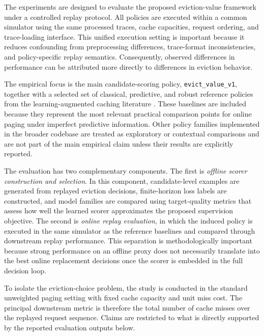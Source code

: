 \documentclass[preprint,12pt]{elsarticle}
\begin{document}
The experiments are designed to evaluate the proposed eviction-value framework under a controlled replay protocol. All policies are executed within a common simulator using the same processed traces, cache capacities, request ordering, and trace-loading interface. This unified execution setting is important because it reduces confounding from preprocessing differences, trace-format inconsistencies, and policy-specific replay semantics. Consequently, observed differences in performance can be attributed more directly to differences in eviction behavior.

The empirical focus is the main candidate-scoring policy, \texttt{evict\_value\_v1}, together with a selected set of classical, predictive, and robust reference policies from the learning-augmented caching literature \cite{lykouris2021competitive_caching,antoniadis2020online_metric_untrusted,wei2020better_simpler_lac,chledowski2021robust_lac_experimental}. These baselines are included because they represent the most relevant practical comparison points for online paging under imperfect predictive information. Other policy families implemented in the broader codebase are treated as exploratory or contextual comparisons and are not part of the main empirical claim unless their results are explicitly reported.

The evaluation has two complementary components. The first is \emph{offline scorer construction and selection}. In this component, candidate-level examples are generated from replayed eviction decisions, finite-horizon loss labels are constructed, and model families are compared using target-quality metrics that assess how well the learned scorer approximates the proposed supervision objective. The second is \emph{online replay evaluation}, in which the induced policy is executed in the same simulator as the reference baselines and compared through downstream replay performance. This separation is methodologically important because strong performance on an offline proxy does not necessarily translate into the best online replacement decisions once the scorer is embedded in the full decision loop.

To isolate the eviction-choice problem, the study is conducted in the standard unweighted paging setting with fixed cache capacity and unit miss cost. The principal downstream metric is therefore the total number of cache misses over the replayed request sequence. Claims are restricted to what is directly supported by the reported evaluation outputs below.
\end{document}
